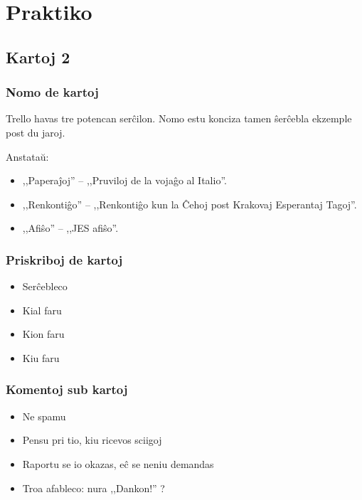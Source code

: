 \section{Praktiko}
\subsection{Kartoj 2}

  \begin{frame}
    \frametitle{Nomo de kartoj}
		
	Trello havas tre potencan serĉilon. Nomo estu konciza tamen ŝerĉebla ekzemple post du jaroj.
	
	Anstataŭ:
	\begin{itemize}
		\item ,,Paperaĵoj'' -- ,,Pruviloj de la vojaĝo al Italio''.
		\item ,,Renkontiĝo'' -- ,,Renkontiĝo kun la Ĉehoj post Krakovaj Esperantaj Tagoj''.
		\item ,,Afiŝo'' -- ,,JES afiŝo''.
	\end{itemize}
  \end{frame}


  \begin{frame}
    \frametitle{Priskriboj de kartoj}
			
  	
	\begin{itemize}
		\item Serĉebleco
		\pause
		\item Kial faru
		\pause
		\item Kion faru
		\pause
		\item Kiu faru
	\end{itemize}
	
  \end{frame}

  \begin{frame}
    \frametitle{Komentoj sub kartoj}
	
  		
	\begin{itemize}
		\item Ne spamu
		\pause
		\item Pensu pri tio, kiu ricevos sciigoj
		\pause
		\item Raportu se io okazas, eĉ se neniu demandas
		\pause
		\item Troa afableco: nura ,,Dankon!'' ?
	\end{itemize}
	
  \end{frame}


